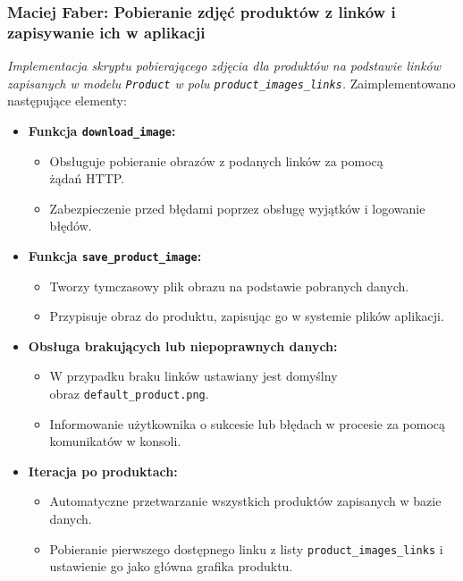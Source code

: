 \documentclass[12pt,a4paper,oneside]{article}
\theoremstyle{definition}
\numberwithin{equation}{section}
\begin{document}
\subsubsection{Maciej Faber: Pobieranie zdjęć produktów z linków i zapisywanie ich w aplikacji}
\label{section:1.3.43}
\textit{
Implementacja skryptu pobierającego zdjęcia dla produktów na podstawie linków zapisanych w modelu \texttt{Product} w polu \texttt{product\_images\_links}.
}
Zaimplementowano następujące elementy:
\begin{itemize}
    \item \textbf{Funkcja \texttt{download\_image}:}
    \begin{itemize}
        \item Obsługuje pobieranie obrazów z podanych linków za pomocą\\ żądań HTTP.
        \item Zabezpieczenie przed błędami poprzez obsługę wyjątków i logowanie błędów.
    \end{itemize}
    \item \textbf{Funkcja \texttt{save\_product\_image}:}
    \begin{itemize}
        \item Tworzy tymczasowy plik obrazu na podstawie pobranych danych.
        \item Przypisuje obraz do produktu, zapisując go w systemie plików aplikacji.
    \end{itemize}
    \item \textbf{Obsługa brakujących lub niepoprawnych danych:}
    \begin{itemize}
        \item W przypadku braku linków ustawiany jest domyślny\\ obraz \texttt{default\_product.png}.
        \item Informowanie użytkownika o sukcesie lub błędach w procesie za pomocą komunikatów w konsoli.
    \end{itemize}
    \item \textbf{Iteracja po produktach:}
    \begin{itemize}
        \item Automatyczne przetwarzanie wszystkich produktów zapisanych w bazie danych.
        \item Pobieranie pierwszego dostępnego linku z listy \texttt{product\_images\_links} i ustawienie go jako główna grafika produktu.
    \end{itemize}
\end{itemize}
\end{document}
